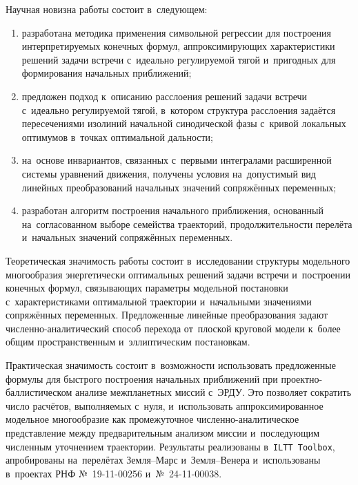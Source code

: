 Научная новизна работы состоит в~следующем:
\begin{enumerate}[beginpenalty=10000]
    \item разработана методика применения символьной регрессии для построения интерпретируемых конечных формул, аппроксимирующих характеристики решений задачи встречи с~идеально регулируемой тягой и~пригодных для формирования начальных приближений;
    \item предложен подход к~описанию расслоения решений задачи встречи с~идеально регулируемой тягой, в~котором структура расслоения задаётся пересечениями изолиний начальной синодической фазы с~кривой локальных оптимумов в~точках оптимальной дальности;
    \item на~основе инвариантов, связанных с~первыми интегралами расширенной системы уравнений движения, получены условия на~допустимый вид линейных преобразований начальных значений сопряжённых переменных;
    \item разработан алгоритм построения начального приближения, основанный на~согласованном выборе семейства траекторий, продолжительности перелёта и~начальных значений сопряжённых переменных.
\end{enumerate}

Теоретическая значимость работы состоит в~исследовании структуры модельного многообразия энергетически оптимальных решений задачи встречи и~построении конечных формул, связывающих параметры модельной постановки с~характеристиками оптимальной траектории и~начальными значениями сопряжённых переменных. Предложенные линейные преобразования задают численно-аналитический способ перехода от~плоской круговой модели к~более общим пространственным и~эллиптическим постановкам.

Практическая значимость состоит в~возможности использовать предложенные формулы для быстрого построения начальных приближений при проектно-баллистическом анализе межпланетных миссий с~ЭРДУ. Это позволяет сократить число расчётов, выполняемых с~нуля, и~использовать аппроксимированное модельное многообразие как промежуточное численно-аналитическое представление между предварительным анализом миссии и~последующим численным уточнением траектории. Результаты реализованы в~\texttt{ILTT Toolbox}, апробированы на~перелётах Земля--Марс и~Земля--Венера и~использованы в~проектах РНФ №~19-11-00256 и~№~24-11-00038.

